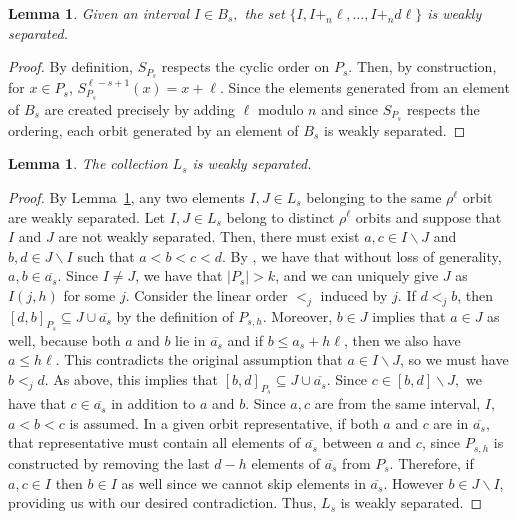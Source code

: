 \documentclass[11pt]{amsart}
\theoremstyle{plain}
\newtheorem{lemma}[theorem]{Lemma}
\theoremstyle{definition}
\begin{document}
\begin{lemma}\label{lemma:LsWeakOrbit} Given an interval $I\in B_s,$ the set $\{I, I+_n\ell, \dots, I +_{n} d\ell\}$ is weakly separated.
 \end{lemma}
\begin{proof}
By definition, $S_{P_s}$ respects the cyclic order on $P_s$. Then, by construction, for $x \in P_s$, $S_{P_s}^{\ell-s+1}(x)=x+\ell$. Since the elements generated from an element of $B_s$ are created precisely by adding $\ell$ modulo $n$ and since $S_{P_s}$ respects the ordering, each orbit generated by an element of $B_s$ is weakly separated.       
\end{proof}
\begin{lemma}\label{lemma:LsWeakNOrbit} The collection $L_s$ is weakly separated. 
\end{lemma}
\begin{proof}

By Lemma~\ref{lemma:LsWeakOrbit}, any two elements $I, J\in L_s$ belonging to the same $\rho^\ell$ orbit are weakly separated. Let $I, J \in L_s$ belong to distinct $\rho^\ell$ orbits and suppose that $I$ and $J$ are not weakly separated. Then, there must exist $a, c \in I\backslash J$ and $b,d \in J \backslash I$ such that $a < b < c < d$. By , we have that without loss of generality, $a, b \in \overline{a_s}$. 
Since $I\neq J$, we have that $|P_s|>k$, and we can uniquely give $J$ as $I(j, h)$ for some $j$. Consider the linear order $<_j$ induced by $j$. If $d<_j b$, then $[d, b]_{P_s}\subseteq J\cup \overline{a_s}$ by the definition of $P_{s,h}$. Moreover, $b\in J$ implies that $a\in J$ as well, because both $a$ and $b$ lie in $\overline{a_s}$ and if $b \leq a_s + h\ell$, then we also have $a\leq h\ell$. This contradicts the original assumption that $a\in I\backslash J$, so we must have $b<_j d$. As above, this implies that $[b, d]_{P_s}\subseteq J\cup \overline{a_s}$. Since $c\in [b,d]\backslash J,$ we have that $c\in \overline{a_s}$ in addition to $a$ and $b$.  Since $a,c$ are from the same interval, $I,$ $a<b<c$ is assumed. In a given orbit representative, if both $a$ and $c$ are in $\overline{a_s}$, that representative must contain all elements of $\overline{a_s}$ between $a$ and $c$, since 
$P_{s,h}$ is constructed by removing the last $d-h$ elements of $\overline{a_s}$ from $P_{s}$. Therefore, if $a,c\in I$ then $b\in I$ as well since we cannot skip elements in $\overline{a_s}$.  However $b\in J\backslash I$, providing us with our desired contradiction. Thus, $L_s$ is weakly separated. 

\end{proof}
\end{document}
